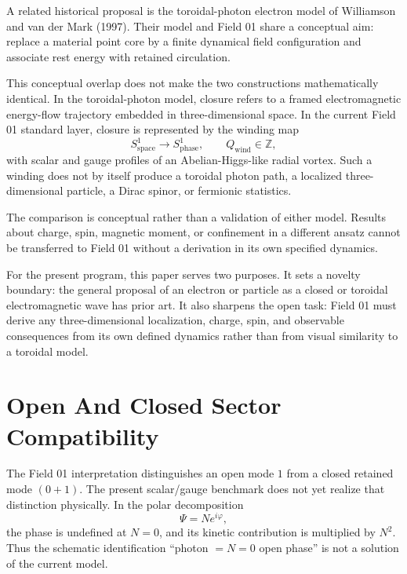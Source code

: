 \documentclass[11pt,a4paper]{article}
\newcommand{\phase}{\varphi}
\newcommand{\wind}{\mathrm{wind}}
\begin{document}
A related historical proposal is the toroidal-photon electron model of Williamson and van der Mark (1997). Their model and Field 01 share a conceptual aim: replace a material point core by a finite dynamical field configuration and associate rest energy with retained circulation.

This conceptual overlap does not make the two constructions mathematically identical. In the toroidal-photon model, closure refers to a framed electromagnetic energy-flow trajectory embedded in three-dimensional space. In the current Field 01 standard layer, closure is represented by the winding map
\begin{equation}
S^1_{\mathrm{space}}\longrightarrow S^1_{\mathrm{phase}},
\qquad Q_{\wind}\in\mathbb{Z},
\end{equation}
with scalar and gauge profiles of an Abelian-Higgs-like radial vortex. Such a winding does not by itself produce a toroidal photon path, a localized three-dimensional particle, a Dirac spinor, or fermionic statistics.

The comparison is conceptual rather than a validation of either model. Results about charge, spin, magnetic moment, or confinement in a different ansatz cannot be transferred to Field 01 without a derivation in its own specified dynamics.

For the present program, this paper serves two purposes. It sets a novelty boundary: the general proposal of an electron or particle as a closed or toroidal electromagnetic wave has prior art. It also sharpens the open task: Field 01 must derive any three-dimensional localization, charge, spin, and observable consequences from its own defined dynamics rather than from visual similarity to a toroidal model.

\section{Open And Closed Sector Compatibility}

The Field 01 interpretation distinguishes an open mode $1$ from a closed retained mode $(0+1)$. The present scalar/gauge benchmark does not yet realize that distinction physically. In the polar decomposition
\begin{equation}
\Psi=Ne^{i\phase},
\end{equation}
the phase is undefined at $N=0$, and its kinetic contribution is multiplied by $N^2$. Thus the schematic identification ``photon $=N=0$ open phase'' is not a solution of the current model.
\end{document}

